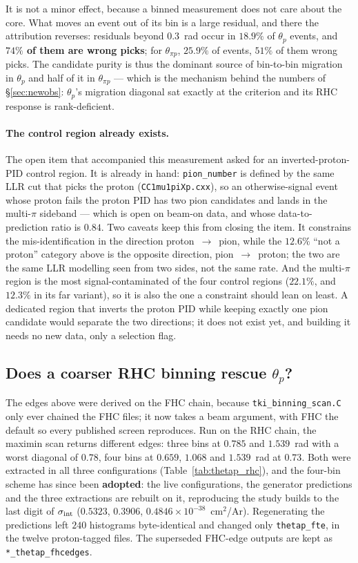 It is not a minor effect, because a binned measurement does not care about the core. What moves an
event out of its bin is a large residual, and there the attribution reverses: residuals beyond
$0.3$~rad occur in $18.9\%$ of $\theta_p$ events, and \textbf{$74\%$ of them are wrong picks};
for $\theta_{\pi p}$, $25.9\%$ of events, $51\%$ of them wrong picks. The candidate purity is thus
the dominant source of bin-to-bin migration in $\theta_p$ and half of it in $\theta_{\pi p}$ --- which
is the mechanism behind the numbers of \S\ref{sec:newobs}: $\theta_p$'s migration diagonal sat exactly
at the criterion and its RHC response is rank-deficient.

\paragraph{The control region already exists.} The open item that accompanied this measurement asked
for an inverted-proton-PID control region. It is already in hand: \texttt{pion\_number} is defined by
the same LLR cut that picks the proton (\texttt{CC1mu1piXp.cxx}), so an otherwise-signal event whose
proton fails the proton PID has two pion candidates and lands in the multi-$\pi$ sideband --- which
is open on beam-on data, and whose data-to-prediction ratio is $0.84$. Two caveats keep this from
closing the item. It constrains the mis-identification in the direction proton~$\to$~pion, while the
$12.6\%$ ``not a proton'' category above is the opposite direction, pion~$\to$~proton; the two are
the same LLR modelling seen from two sides, not the same rate. And the multi-$\pi$ region is the most
signal-contaminated of the four control regions ($22.1\%$, and $12.3\%$ in its far variant), so it is
also the one a constraint should lean on least. A dedicated region that inverts the proton PID while
keeping exactly one pion candidate would separate the two directions; it does not exist yet, and
building it needs no new data, only a selection flag.

\subsection{Does a coarser RHC binning rescue $\theta_p$?}
\label{sec:thetap_rhc}

The edges above were derived on the FHC chain, because \texttt{tki\_binning\_scan.C} only ever
chained the FHC files; it now takes a beam argument, with FHC the default so every published screen
reproduces. Run on the RHC chain, the maximin scan returns different edges: three bins at
$0.785$ and $1.539$~rad with a worst diagonal of $0.78$, four bins at $0.659$, $1.068$ and
$1.539$~rad at $0.73$. Both were extracted in all three configurations (Table~\ref{tab:thetap_rhc}), and the four-bin
scheme has since been \textbf{adopted}: the live configurations, the generator predictions and the
three extractions are rebuilt on it, reproducing the study builds to the last digit of
$\sigma_{\rm int}$ ($0.5323$, $0.3906$, $0.4846\times10^{-38}$~cm$^2$/Ar). Regenerating the
predictions left $240$ histograms byte-identical and changed only \texttt{thetap\_fte}, in the
twelve proton-tagged files. The superseded FHC-edge outputs are kept as \texttt{*\_thetap\_fhcedges}.

